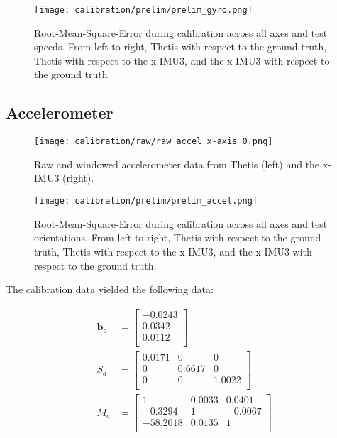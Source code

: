 \begin{figure}[h!]
    \centering
    \texttt{[image: calibration/prelim/prelim\_gyro.png]}
    \caption[Cumulative gyroscope error]{Root-Mean-Square-Error during calibration across all axes and test speeds. From left to right, Thetis with respect to the ground truth, Thetis with respect to the x-IMU3, and the x-IMU3 with respect to the ground truth.}
\end{figure}

\newpage 
\subsection{Accelerometer}

\begin{figure}
    \centering
    \texttt{[image: calibration/raw/raw\_accel\_x-axis\_0.png]}
    \caption[Raw and windowed accelerometer data]{Raw and windowed accelerometer data from Thetis (left) and the x-IMU3 (right).}
\end{figure}

\begin{figure}
    \centering
    \texttt{[image: calibration/prelim/prelim\_accel.png]}
    \caption[Cumulative accelerometer error]{Root-Mean-Square-Error during calibration across all axes and test orientations. From left to right, Thetis with respect to the ground truth, Thetis with respect to the x-IMU3, and the x-IMU3 with respect to the ground truth.}
\end{figure}

The calibration data yielded the following data:

\begin{align*}
    \pmb{b}_a &= 
    \begin{bmatrix}
        -0.0243 \\
        0.0342 \\
        0.0112 \\
    \end{bmatrix} \\
    S_a &= 
    \begin{bmatrix}
        0.0171 & 0      & 0 \\
        0      & 0.6617 & 0 \\
        0      & 0      & 1.0022 \\
    \end{bmatrix} \\
    M_a &= 
    \begin{bmatrix}
        1        & 0.0033 & 0.0401 \\
        -0.3294  & 1      & -0.0067 \\
        -58.2018 & 0.0135 & 1 \\
    \end{bmatrix}
\end{align*}

